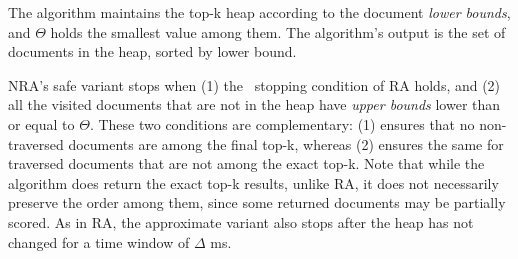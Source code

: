 The algorithm maintains the top-k heap according to the document \emph{lower bounds}, and $\Theta$ holds the smallest value among them. 
The algorithm's output is the set of documents in the heap, sorted by lower bound.

NRA's safe variant stops when (1) the \RAStop\ stopping condition of RA holds, 
and (2) all the  visited documents that are not in the heap have \emph{upper bounds} lower than or equal to $\Theta$. These two conditions are complementary: (1) ensures that no non-traversed documents are among the final top-k, whereas (2) ensures the same for traversed documents that are not among the exact top-k. 
Note that while the algorithm does return the exact top-k results, unlike RA, it does not necessarily preserve the order among them, since some returned documents may be partially scored. As in RA, the approximate variant also stops after the heap has not changed for a time window of $\Delta$ ms.

